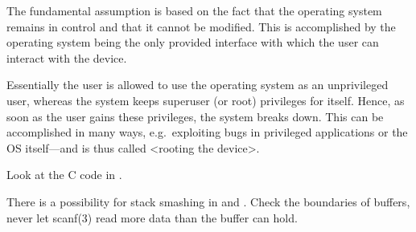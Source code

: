 \documentclass[svv,addpoints]{miunexam}
\begin{document}
\begin{questions}
  
  \begin{solution}
    The fundamental assumption is based on the fact that the operating system 
    remains in control and that it cannot be modified.
    This is accomplished by the operating system being the only provided 
    interface with which the user can interact with the device.

    Essentially the user is allowed to use the operating system as an 
    unprivileged user, whereas the system keeps superuser (or root) privileges 
    for itself.
    Hence, as soon as the user gains these privileges, the system breaks down.
    This can be accomplished in many ways, e.g.~exploiting bugs in privileged 
    applications or the OS itself---and is thus called <rooting the device>.
  \end{solution}


  
\question\label{q:software:stacksmash:C}
  Look at the C code in .
  \begin{solution}
    There is a possibility for stack smashing in  and 
    .
    Check the boundaries of buffers, never let scanf(3) read more data than the 
    buffer can hold.


\end{solution}
\end{questions}
\end{document}
